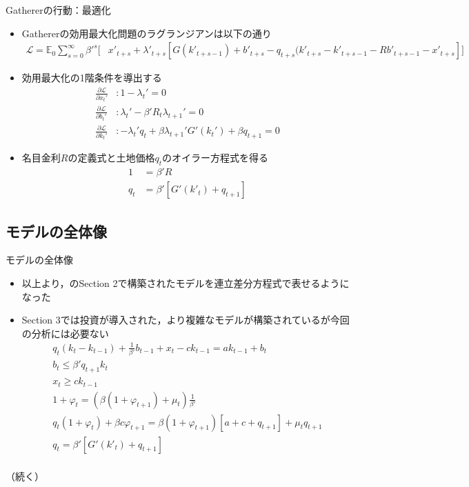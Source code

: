 \documentclass[aspectratio=169, dvipdfmx, 11pt, uplatex]{beamer}
\begin{document}
\begin{frame}{Gathererの行動：最適化}
  \begin{itemize}
    \item Gathererの効用最大化問題のラグランジアンは以下の通り
      \begin{equation}
        \begin{aligned}
          \mathcal{L} = \mathbb{E}_0 \sum_{s=0}^{\infty} \beta'^s \bigg[ & x'_{t+s} + \lambda'_{t+s} [G(k'_{t+s-1}) + b'_{t+s} - q_{t+s} (k'_{t+s} - k'_{t+s-1} - R b'_{t+s-1} - x'_{t+s}] \bigg]
        \end{aligned}
      \end{equation}
    \item 効用最大化の1階条件を導出する
      \begin{align}
        \frac{\partial \mathcal{L}}{\partial x_t'} &: 1 - \lambda_t' = 0 \\
        \frac{\partial \mathcal{L}}{\partial b_t'} &: \lambda_t' - \beta' R_t \lambda_{t+1}' = 0 \\
        \frac{\partial \mathcal{L}}{\partial k_t'} &: -\lambda_t' q_t + \beta \lambda_{t+1}' G'(k_t') + \beta q_{t+1} = 0
      \end{align}
    \item 名目金利$R$の定義式と土地価格$q_t$のオイラー方程式を得る
      \begin{align}
        1 &= \beta' R \label{eq:rishi} \\
        q_t &= \beta' [G'(k'_t) + q_{t+1}]
      \end{align}
  \end{itemize}
\end{frame}

\subsection{モデルの全体像}
\begin{frame}{モデルの全体像}
  \begin{itemize}
    \item 以上より，\textcite{KM1997}のSection 2で構築されたモデルを連立差分方程式で表せるようになった
    \item Section 3では投資が導入された，より複雑なモデルが構築されているが今回の分析には必要ない
      \begin{gather}
        q_t(k_t - k_{t-1}) + \frac{1}{\beta'} b_{t-1} + x_t - c k_{t-1} = a k_{t-1} + b_t \label{eq:model1} \\
        b_t \leq \beta' q_{t+1} k_t \label{eq:model2} \\
        x_t \geq c k_{t-1} \\
        1 + \varphi_t = (\beta(1+\varphi_{t+1}) + \mu_t) \frac{1}{\beta'} \label{} \\
        q_t (1 + \varphi_t) + \beta c \varphi_{t+1} = \beta(1 + \varphi_{t+1})[a + c + q_{t+1}] + \mu_t q_{t+1} \\
        q_t = \beta' [G'(k'_t) + q_{t+1}] \\
      \end{gather}
  \end{itemize}
  （続く）
\end{frame}
\end{document}
